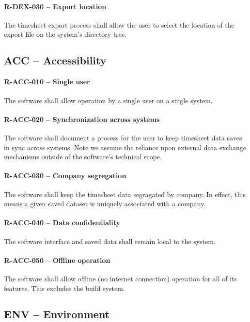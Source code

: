 \paragraph{R-DEX-030 -- Export location}
The timesheet export process shall allow the user to select the location
of the export file on the system's directory tree.

\subsection{ACC -- Accessibility}
\paragraph{R-ACC-010 -- Single user}
The software shall allow operation by a single user on a single system.

\paragraph{R-ACC-020 -- Synchronization across systems}
The software shall document a process for the user to keep timesheet data
saves in sync across systems. Note we assume the reliance upon external
data exchange mechanisms outside of the software's technical scope.

\paragraph{R-ACC-030 -- Company segregation}
The software shall keep the timesheet data segragated by company.
In effect, this means a given saved dataset is uniquely associated with a
company.

\paragraph{R-ACC-040 -- Data confidentiality}
The software interface and saved data shall remain local to the system.

\paragraph{R-ACC-050 -- Offline operation}
The software shall allow offline (no internet connection) operation for all of
its features. This excludes the build system.

\subsection{ENV -- Environment}
